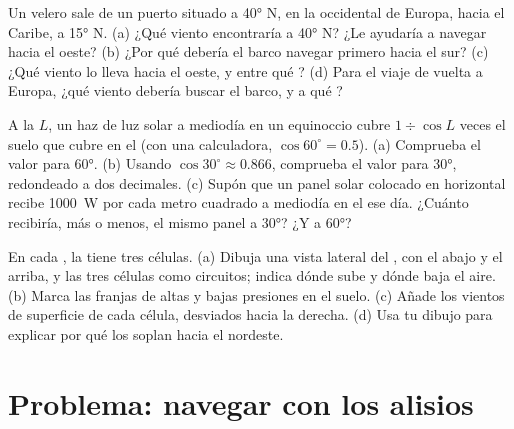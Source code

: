 \begin{exercise}[$\star\star$]\label{exo:g8:winds-global-circulation:10}
Un velero sale de un puerto situado a \ang{40} N, en la  occidental de
Europa, hacia el Caribe, a \ang{15} N. (a) ¿Qué viento encontraría a
\ang{40} N? ¿Le ayudaría a navegar hacia el oeste? (b) ¿Por qué debería el
barco navegar primero hacia el sur? (c) ¿Qué viento lo lleva hacia el
oeste, y entre qué ? (d) Para el viaje de vuelta a Europa, ¿qué
viento debería buscar el barco, y a qué ?
\end{exercise}

\begin{exercise}[$\star\star\star$]\label{exo:g8:winds-global-circulation:11}
A la  $L$, un haz de luz solar a mediodía en un equinoccio cubre
$1 \div
\cos L$ veces el suelo que cubre en el  (con una calculadora,
$\cos 60^\circ = 0.5$). (a) Comprueba el valor para \ang{60}. (b) Usando
$\cos 30^\circ \approx 0.866$, comprueba el valor para \ang{30},
redondeado a dos decimales. (c) Supón que un panel solar colocado en
horizontal recibe \qty{1000}{W} por cada metro cuadrado a mediodía en el
 ese día. ¿Cuánto recibiría, más o menos, el mismo panel a
\ang{30}? ¿Y a \ang{60}?
\end{exercise}

\begin{exercise}[$\star\star\star$]\label{exo:g8:winds-global-circulation:12}
En cada , la  tiene tres células. (a) Dibuja
una vista lateral del , con el  abajo y el 
arriba, y las tres células como circuitos; indica dónde sube y dónde baja
el aire. (b) Marca las franjas de altas y bajas presiones en el suelo.
(c) Añade los vientos de superficie de cada célula, desviados hacia la
derecha. (d) Usa tu dibujo para explicar por qué los 
soplan hacia el nordeste.
\end{exercise}

\section{Problema: navegar con los alisios}


